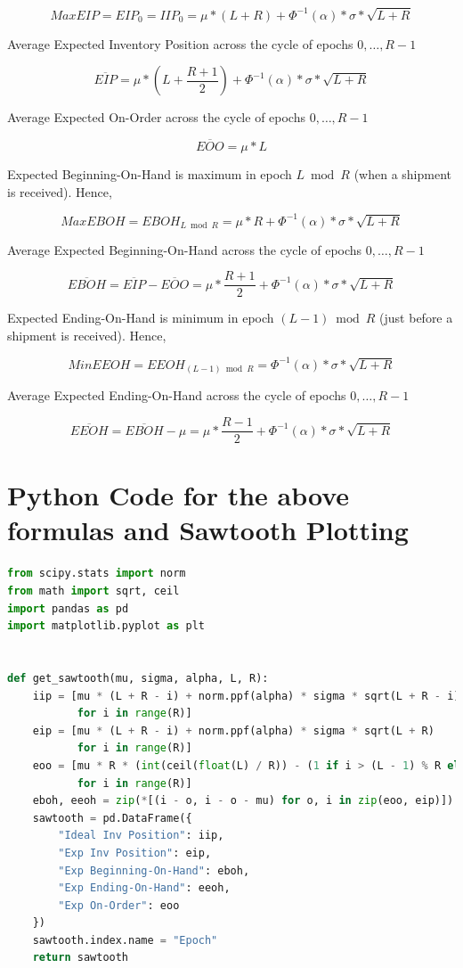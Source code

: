\documentclass[11pt]{amsart}
\begin{document}
\begin{appendices}
$$Max EIP = EIP_0 = IIP_0 = \mu * (L + R) + \Phi^{-1}(\alpha) * \sigma * \sqrt{L+R}$$

Average Expected Inventory Position across the cycle of epochs $0, \ldots, R - 1$

$$\overline{EIP} = \mu * (L + \frac {R + 1} 2) + \Phi^{-1}(\alpha) * \sigma * \sqrt{L+R}$$

Average Expected On-Order across the cycle of epochs $0, \ldots, R - 1$

$$\overline{EOO} = \mu * L$$

Expected Beginning-On-Hand is maximum in epoch $L \bmod R$ (when a shipment is received). Hence,

$$Max EBOH = EBOH_{L \bmod R} = \mu * R + \Phi^{-1}(\alpha) * \sigma * \sqrt{L+R}$$

Average Expected Beginning-On-Hand across the cycle of epochs $0, \ldots, R - 1$

$$\overline{EBOH} = \overline{EIP} - \overline{EOO} = \mu * \frac {R + 1} 2 + \Phi^{-1}(\alpha) * \sigma * \sqrt{L+R} $$

Expected Ending-On-Hand is minimum in epoch $(L - 1) \bmod R$ (just before a shipment is received). Hence,

$$Min EEOH = EEOH_{(L - 1) \bmod R} = \Phi^{-1}(\alpha) * \sigma * \sqrt{L+R}$$

Average Expected Ending-On-Hand across the cycle of epochs $0, \ldots, R - 1$

$$\overline{EEOH} = \overline{EBOH} - \mu = \mu * \frac {R - 1} 2 + \Phi^{-1}(\alpha) * \sigma * \sqrt{L+R}$$

\section{Python Code for the above formulas and Sawtooth Plotting}
\label{appendix:PythonCode}

\begin{lstlisting}[language=Python]
from scipy.stats import norm
from math import sqrt, ceil
import pandas as pd
import matplotlib.pyplot as plt


def get_sawtooth(mu, sigma, alpha, L, R):
    iip = [mu * (L + R - i) + norm.ppf(alpha) * sigma * sqrt(L + R - i)
           for i in range(R)]
    eip = [mu * (L + R - i) + norm.ppf(alpha) * sigma * sqrt(L + R)
           for i in range(R)]
    eoo = [mu * R * (int(ceil(float(L) / R)) - (1 if i > (L - 1) % R else 0))
           for i in range(R)]
    eboh, eeoh = zip(*[(i - o, i - o - mu) for o, i in zip(eoo, eip)])
    sawtooth = pd.DataFrame({
        "Ideal Inv Position": iip,
        "Exp Inv Position": eip,
        "Exp Beginning-On-Hand": eboh,
        "Exp Ending-On-Hand": eeoh,
        "Exp On-Order": eoo
    })
    sawtooth.index.name = "Epoch"
    return sawtooth



\end{lstlisting}
\end{appendices}
\end{document}
